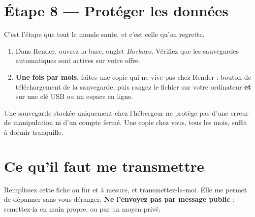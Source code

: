 \documentclass[11pt,a4paper]{article}
\newcommand{\champ}[1]{\textit{#1}}
\begin{document}
\section{Étape 8 — Protéger les données}

C'est l'étape que tout le monde saute, et c'est celle qu'on regrette.

\begin{enumerate}
  \item Dans Render, ouvrez la base, onglet \champ{Backups}. Vérifiez que les
        sauvegardes automatiques sont actives sur votre offre.
  \item \textbf{Une fois par mois}, faites une copie qui ne vive pas chez
        Render : bouton de téléchargement de la sauvegarde, puis rangez le
        fichier sur votre ordinateur \textbf{et} sur une clé USB ou un espace
        en ligne.
\end{enumerate}

\begin{conseil}
Une sauvegarde stockée uniquement chez l'hébergeur ne protège pas d'une erreur
de manipulation ni d'un compte fermé. Une copie chez vous, tous les mois, suffit
à dormir tranquille.
\end{conseil}

\section{Ce qu'il faut me transmettre}
\label{sec:fiche}

Remplissez cette fiche au fur et à mesure, et transmettez-la-moi. Elle me permet
de dépanner sans vous déranger. \textbf{Ne l'envoyez pas par message public} :
remettez-la en main propre, ou par un moyen privé.
\end{document}

